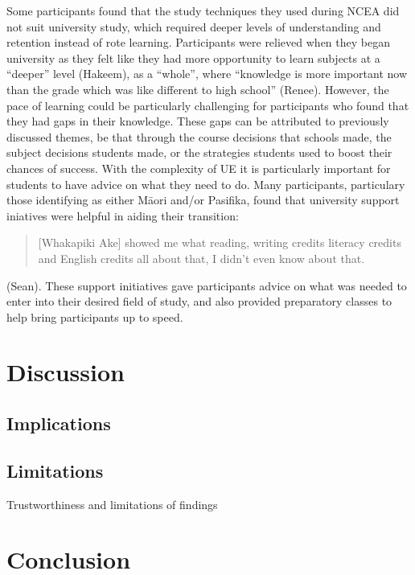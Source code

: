 \documentclass[a4paper,man,natbib]{apa6}
\begin{document}
Some participants found that the study techniques they used during NCEA did not suit university study, which required deeper levels of understanding and retention instead of rote learning. Participants were relieved when they began university as they felt like they had more opportunity to learn subjects at a ``deeper'' level (Hakeem), as a ``whole'', where ``knowledge is more important now than the grade which was like different to high school'' (Renee). However, the pace of learning could be particularly challenging for participants who found that they had gaps in their knowledge. These gaps can be attributed to previously discussed themes, be that through the course decisions that schools made, the subject decisions students made, or the strategies students used to boost their chances of success. With the complexity of UE it is particularly important for students to have advice on what they need to do. Many participants, particulary those identifying as either M\={a}ori and/or Pasifika, found that university support iniatives were helpful in aiding their transition: \blockquote{[Whakapiki Ake] showed me what reading, writing credits literacy credits and English credits all about that, I didn't even know about that.} (Sean). These support initiatives gave participants advice on what was needed to enter into their desired field of study, and also provided preparatory classes to help bring participants up to speed.

\section{Discussion}

\subsection*{Implications}


\subsection{Limitations} Trustworthiness and limitations of findings 


\section{Conclusion}
\end{document}
